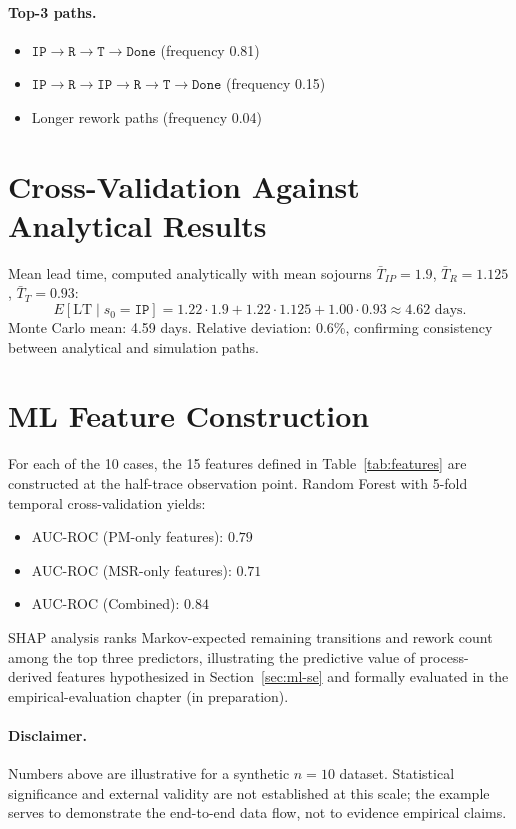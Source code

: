 \paragraph{Top-3 paths.}
\begin{itemize}
  \item $\mathtt{IP} \to \mathtt{R} \to \mathtt{T} \to \mathtt{Done}$
    (frequency 0.81)
  \item $\mathtt{IP} \to \mathtt{R} \to \mathtt{IP} \to \mathtt{R} \to
    \mathtt{T} \to \mathtt{Done}$ (frequency 0.15)
  \item Longer rework paths (frequency 0.04)
\end{itemize}


\section{Cross-Validation Against Analytical Results}
\label{app:D-validation}

Mean lead time, computed analytically with mean sojourns $\bar{T}_{IP} =
1.9$, $\bar{T}_R = 1.125$, $\bar{T}_T = 0.93$:
\begin{equation}
E[\mathrm{LT} \mid s_0 = \mathtt{IP}]
= 1.22 \cdot 1.9 + 1.22 \cdot 1.125 + 1.00 \cdot 0.93 \approx 4.62 \text{ days}.
\end{equation}
Monte Carlo mean: 4.59 days. Relative deviation: 0.6\%, confirming
consistency between analytical and simulation paths.


\section{ML Feature Construction}
\label{app:D-ml}

For each of the 10 cases, the 15 features defined in
Table~\ref{tab:features} are constructed at the half-trace observation
point. Random Forest with 5-fold temporal cross-validation yields:
\begin{itemize}
  \item AUC-ROC (PM-only features): $0.79$
  \item AUC-ROC (MSR-only features): $0.71$
  \item AUC-ROC (Combined): $0.84$
\end{itemize}
SHAP analysis ranks Markov-expected remaining transitions and rework
count among the top three predictors, illustrating the predictive value
of process-derived features hypothesized in Section~\ref{sec:ml-se} and
formally evaluated in the empirical-evaluation chapter (in preparation).

\paragraph{Disclaimer.} Numbers above are illustrative for a synthetic
$n=10$ dataset. Statistical significance and external validity are not
established at this scale; the example serves to demonstrate the
end-to-end data flow, not to evidence empirical claims.
